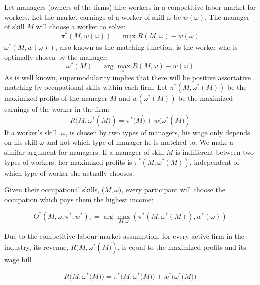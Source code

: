 \documentclass[12 pt]{article}
\begin{document}
Let managers (owners of the firms) hire workers in a competitive labor market for workers. Let the market earnings of a worker of skill $\omega$ be $w(\omega)$. The manager of skill $M$ will choose a worker to solve:
\begin{equation}
	\pi^{\ast}(M,w(\omega))=\max_{\omega}R(M,\omega)-w(\omega) \label{profit max}
\end{equation}
$\omega^{\ast}(M,w(\omega))$, also known as the matching function, is the worker who is optimally chosen by the manager:
\begin{equation}
	\omega^{\ast}(M)=\arg\max_{\omega}R(M,\omega)-w(\omega) \label{worker choice}
\end{equation}
As is well known, supermodularity implies that there will be positive assortative matching by occupational skills within each firm. Let $\pi^{\ast}(M,\omega^{\ast}(M))$ be the maximized profits of the manager $M$ and $w(\omega^{\ast}(M))$ be the maximized earnings of the worker in the firm:
\begin{equation}
	R(M,\omega^{\ast}(M\dot{)})=\pi^{\ast}(M\dot{)}+w(\omega^{\ast}(M\dot{)})
	\label{5}
\end{equation}
If a worker's skill, $\omega$, is chosen by two types of managers, his wage only depends on his skill $\omega$ and not which type of manager he is matched to. We make a similar argument for managers. If a manager of skill $M$ is
indifferent between two types of workers, her maximized profits is $\pi^{\ast}(M,\omega^{\ast}(M))$, independent of which type of worker she actually chooses.

Given their occupational skills, ($M,\omega)$, every participant will choose
the occupation which pays them the highest income:%

\begin{equation}
	O^{\ast}(M,\omega,\pi^{\ast},w^{\ast}),=\arg\max_{M,\omega}(\pi^{\ast
	}(M,\omega^{\ast}(M)),w^{\ast}(\omega)) 
	\label{occupational choice}
\end{equation}


Due to the competitive labour market assumption, for every active firm in the
industry, its revenue, $R(M,\omega^{\ast}(M\dot{)})$, is equal to the
maximized profits and its wage bill%

\begin{equation}
	R(M,\omega^{\ast}(M\dot{)}\dot{)}=\pi^{\ast}(M,\omega^{\ast}(M\dot{)}\dot
	{)}+w^{\ast}(\omega^{\ast}(M\dot{)}\dot{)} \label{6}%
\end{equation}
\end{document}
